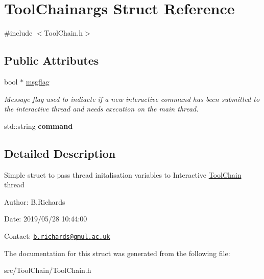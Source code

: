 \hypertarget{structToolChainargs}{\section{Tool\-Chainargs Struct Reference}
\label{structToolChainargs}
}


{\ttfamily \#include $<$Tool\-Chain.\-h$>$}

\subsection*{Public Attributes}
\begin{DoxyCompactItemize}
\item 
\hypertarget{structToolChainargs_a3551269b039d543b844a2d0d924ce96b}{bool $\ast$ \hyperlink{structToolChainargs_a3551269b039d543b844a2d0d924ce96b}{msgflag}}\label{structToolChainargs_a3551269b039d543b844a2d0d924ce96b}

\begin{DoxyCompactList}\small\item\em Message flag used to indiacte if a new interactive command has been submitted to the interactive thread and needs execution on the main thread. \end{DoxyCompactList}\item 
\hypertarget{structToolChainargs_a9d4c78b8b89eba4b7e8af9e6278c1bfd}{std\-::string {\bfseries command}}\label{structToolChainargs_a9d4c78b8b89eba4b7e8af9e6278c1bfd}

\end{DoxyCompactItemize}


\subsection{Detailed Description}
Simple struct to pass thread initalisation variables to Interactive \hyperlink{classToolChain}{Tool\-Chain} thread

\begin{DoxyParagraph}{Author\-:}
B.\-Richards 
\end{DoxyParagraph}
\begin{DoxyParagraph}{Date\-:}
2019/05/28 10\-:44\-:00 
\end{DoxyParagraph}
Contact\-: \href{mailto:b.richards@qmul.ac.uk}{\tt b.\-richards@qmul.\-ac.\-uk} 

The documentation for this struct was generated from the following file\-:\begin{DoxyCompactItemize}
\item 
src/\-Tool\-Chain/Tool\-Chain.\-h\end{DoxyCompactItemize}
